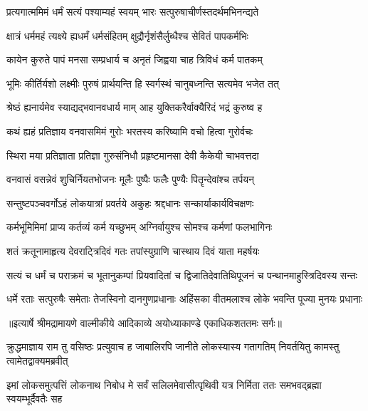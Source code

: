 \twolineshloka
{प्रत्यगात्ममिमं धर्मं सत्यं पश्याम्यहं स्वयम्}
{भारः सत्पुरुषाचीर्णस्तदर्थमभिनन्द्यते} %

\twolineshloka
{क्षात्रं धर्ममहं त्यक्ष्ये ह्यधर्मं धर्मसंहितम्}
{क्षुद्रौर्नृशंसैर्लुब्धैश्च सेवितं पापकर्मभिः} %

\twolineshloka
{कायेन कुरुते पापं मनसा सम्प्रधार्य च}
{अनृतं जिह्वया चाह त्रिविधं कर्म पातकम्} %

\twolineshloka
{भूमिः कीर्तिर्यशो लक्ष्मीः पुरुषं प्रार्थयन्ति हि}
{स्वर्गस्थं चानुबध्नन्ति सत्यमेव भजेत तत्} %

\twolineshloka
{श्रेष्ठं ह्यनार्यमेव स्याद्यद्भवानवधार्य माम्}
{आह युक्तिकरैर्वाक्यैरिदं भद्रं कुरुष्व ह} %

\twolineshloka
{कथं ह्यहं प्रतिज्ञाय वनवासमिमं गुरोः}
{भरतस्य करिष्यामि वचो हित्वा गुरोर्वचः} %

\twolineshloka
{स्थिरा मया प्रतिज्ञाता प्रतिज्ञा गुरुसंनिधौ}
{प्रहृष्टमानसा देवी कैकेयी चाभवत्तदा} %

\twolineshloka
{वनवासं वसन्नेवं शुचिर्नियतभोजनः}
{मूलैः पुष्पैः फलैः पुण्यैः पितॄन्देवांश्च तर्पयन्} %

\twolineshloka
{सन्तुष्टपञ्चवर्गोऽहं लोकयात्रां प्रवर्तये}
{अकुहः श्रद्दधानः सन्कार्याकार्यविचक्षणः} %

\twolineshloka
{कर्मभूमिमिमां प्राप्य कर्तव्यं कर्म यच्छुभम्}
{अग्निर्वायुश्च सोमश्च कर्मणां फलभागिनः} %

\twolineshloka
{शतं क्रतूनामाहृत्य देवराट्त्रिदिवं गतः}
{तपांस्युग्राणि चास्थाय दिवं याता महर्षयः} %

\fourlineindentedshloka
{सत्यं च धर्मं च पराक्रमं च}
{भूतानुकम्पां प्रियवादितां च}
{द्विजातिदेवातिथिपूजनं च}
{पन्थानमाहुस्त्रिदिवस्य सन्तः} %

\fourlineindentedshloka
{धर्मे रताः सत्पुरुषैः समेताः}
{तेजस्विनो दानगुणप्रधानाः}
{अहिंसका वीतमलाश्च लोके}
{भवन्ति पूज्या मुनयः प्रधानाः} %


{॥इत्यार्षे श्रीमद्रामायणे वाल्मीकीये आदिकाव्ये अयोध्याकाण्डे एकाधिकशततमः सर्गः॥}


\threelineshloka
{क्रुद्धमाज्ञाय राम तु वसिष्ठः प्रत्युवाच ह}
{जाबालिरपि जानीते लोकस्यास्य गतागतिम्}
{निवर्तयितु कामस्तु त्वामेतद्वाक्यमब्रवीत्} %

\threelineshloka
{इमां लोकसमुत्पत्तिं लोकनाथ निबोध मे}
{सर्वं सलिलमेवासीत्पृथिवी यत्र निर्मिता}
{ततः समभवद्ब्रह्मा स्वयम्भूर्दैवतैः सह} %

